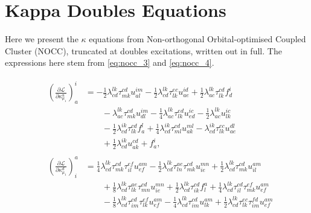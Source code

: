 \section{Kappa Doubles Equations}
\label{app:kappa_equations}

Here we present the $\kappa$ equations from Non-orthogonal Orbital-optimised 
Coupled Cluster (NOCC), truncated at doubles excitations, written out in full. 
The expressions here stem from \autoref{eq:nocc_3} and \autoref{eq:nocc_4}.

\begin{align}
    &\begin{aligned}
        \left(\frac{\partial\mathscr{L}}{\partial\kappa^u_{\mu_1}} \right)^{i}_{a}
        &= - \frac{1}{2}\lambda^{lk}_{cd} \tau^{cd}_{mk} u^{im}_{al}
           - \frac{1}{2}\lambda^{lk}_{cd} \tau^{ec}_{lk} u^{id}_{ae}
           + \frac{1}{2}\lambda^{lk}_{ac} \tau^{cd}_{lk} f^{i}_{d}
        \\
        &\qquad
        - \lambda^{lk}_{ac} \tau^{cd}_{mk} u^{im}_{dl}
        - \frac{1}{4}\lambda^{lk}_{ac} \tau^{ed}_{lk} u^{ic}_{ed}
        - \frac{1}{2}\lambda^{lk}_{ac} u^{ic}_{lk}
        \\
        &\qquad
        - \frac{1}{2}\lambda^{ik}_{cd} \tau^{cd}_{lk} f^{l}_{a}
        + \frac{1}{4}\lambda^{ik}_{cd} \tau^{cd}_{ml} u^{ml}_{ak}
        - \lambda^{ik}_{cd} \tau^{ec}_{lk} u^{dl}_{ae}
        \\
        &\qquad
        + \frac{1}{2}\lambda^{ik}_{cd} u^{cd}_{ak} +
        f^{i}_{a},
    \end{aligned} \\
    &\begin{aligned}
        \left(\frac{\partial\mathscr{L}}{\partial\kappa^d_{\mu_1}} \right)^{a}_{i}
        &=
          \frac{1}{4}\lambda^{lk}_{cd} \tau^{cd}_{mk} \tau^{ef}_{il} u^{am}_{ef}
        - \frac{1}{2}\lambda^{lk}_{cd} \tau^{ae}_{ln} \tau^{cd}_{mk} u^{mn}_{ie}
        + \frac{1}{2}\lambda^{lk}_{cd} \tau^{cd}_{mk} u^{am}_{il}
        \\
        &\qquad
        + \frac{1}{8}\lambda^{lk}_{cd} \tau^{ae}_{lk} \tau^{cd}_{mn} u^{mn}_{ie}
        + \frac{1}{2}\lambda^{lk}_{cd} \tau^{cd}_{ik} f^{a}_{l}
        + \frac{1}{4}\lambda^{lk}_{cd} \tau^{cd}_{il} \tau^{ef}_{mk} u^{am}_{ef}
        \\
        &\qquad
        - \frac{1}{8}\lambda^{lk}_{cd} \tau^{cd}_{im} \tau^{ef}_{lk} u^{am}_{ef}
        - \frac{1}{4}\lambda^{lk}_{cd} \tau^{cd}_{im} u^{am}_{lk}
        + \frac{1}{2}\lambda^{lk}_{cd} \tau^{ec}_{lk} \tau^{fd}_{im} u^{am}_{ef}

\end{aligned}
\end{align}
